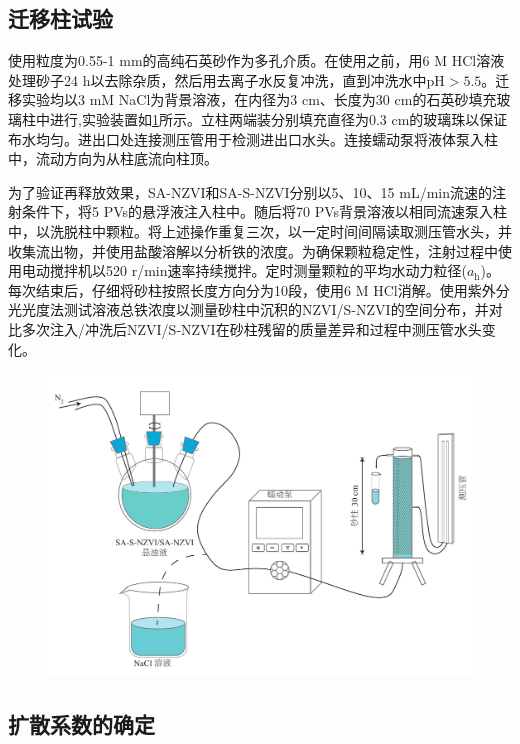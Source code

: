 
\subsection{迁移柱试验}

使用粒度为0.55-1 mm的高纯石英砂作为多孔介质。在使用之前，用6 M HCl溶液处理砂子24 h以去除杂质，然后用去离子水反复冲洗，直到冲洗水中$\mathrm{pH}>5.5$。迁移实验均以3 mM NaCl为背景溶液，在内径为3 cm、长度为30 cm的石英砂填充玻璃柱中进行,实验装置如\cref{column}所示。立柱两端装分别填充直径为0.3 cm的玻璃珠以保证布水均匀。进出口处连接测压管用于检测进出口水头。连接蠕动泵将液体泵入柱中，流动方向为从柱底流向柱顶。

为了验证再释放效果，SA-NZVI和SA-S-NZVI分别以5、10、15 mL/min流速的注射条件下，将5 PVs的悬浮液注入柱中。随后将70 PVs背景溶液以相同流速泵入柱中，以洗脱柱中颗粒。将上述操作重复三次，以一定时间间隔读取测压管水头，并收集流出物，并使用盐酸溶解以分析铁的浓度。为确保颗粒稳定性，注射过程中使用电动搅拌机以520 r/min速率持续搅拌。定时测量颗粒的平均水动力粒径($a_\mathrm{h}$)。每次结束后，仔细将砂柱按照长度方向分为10段，使用6 M HCl消解。使用紫外分光光度法测试溶液总铁浓度以测量砂柱中沉积的NZVI/S-NZVI的空间分布，并对比多次注入/冲洗后NZVI/S-NZVI在砂柱残留的质量差异和过程中测压管水头变化。

\begin{figure}[htb]
    \centering
    \includegraphics[width=12cm]{figs/column.pdf}
    \label{column}
\end{figure}

\subsection{扩散系数的确定}

